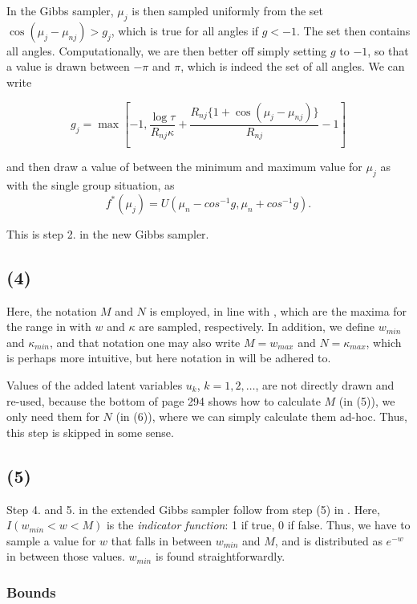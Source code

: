 \documentclass[12pt,a4paper]{article}
\begin{document}
In the Gibbs sampler, $\mu_j$ is then sampled uniformly from the set $ \cos(\mu_j - \mu_{nj}) > g_j$, which is true for all angles if $g < -1$. The set then contains all angles. Computationally, we are then better off simply setting $g$ to $-1$, so that a value is drawn between $-\pi$ and $\pi$, which is indeed the set of all angles. We can write

$$ g_j = \max\left[-1, \frac{\log \tau}{R_{nj} \kappa} + \frac{R_{nj} \{ 1 + \cos (\mu_j - \mu_{nj} ) \} } {R_{nj}} - 1 \right]$$

and then draw a value of between the minimum and maximum value for $\mu_j$ as with the single group situation, as 
$$ f^*(\mu_j) = U(\mu_n - cos^{-1}g, \mu_n + cos^{-1}g).$$

This is step 2. in the new Gibbs sampler.

\subsection{(4)}

Here, the notation $M$ and $N$ is employed, in line with \citet{damien1999fullbayes}, which are the maxima for the range in with  $w$ and $\kappa$  are sampled, respectively. In addition, we define $w_{min}$ and $\kappa_{min}$, and that notation one may also write $M = w_{max}$ and $N = \kappa_{max}$, which is perhaps more intuitive, but here  notation in \citet{damien1999fullbayes} will be adhered to.

Values of the added latent variables $u_k$, $k=1, 2, \dots$, are not directly drawn and re-used, because the bottom of page 294 shows how to calculate $M$ (in (5)), we only need them for $N$ (in (6)), where we can simply calculate them ad-hoc. Thus, this step is skipped in some sense.

\subsection{(5)}

Step 4. and 5. in the extended Gibbs sampler follow from step (5) in \citet{damien1999fullbayes}. Here, $I(w_{min} < w < M)$ is the \textit{indicator function}: 1 if true, 0 if false. Thus, we have to sample a value for $w$ that falls in between $w_{min}$ and $M$, and is distributed as $e^{-w}$ in between those values. $w_{min}$ is found straightforwardly. 

\subsubsection{Bounds}
\end{document}
